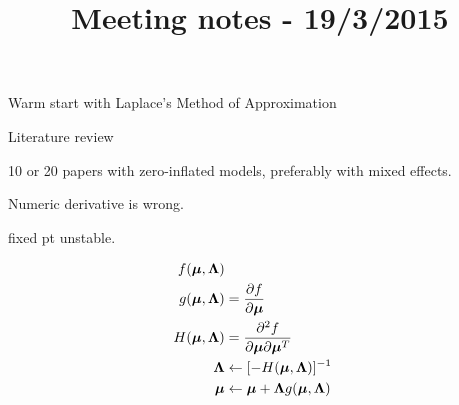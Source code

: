 \documentclass{article}[12pt]
\title{Meeting notes - 19/3/2015}
\begin{document}
Warm start with Laplace's Method of Approximation

Literature review

10 or 20 papers with zero-inflated models, preferably with mixed effects.

Numeric derivative is wrong.

fixed pt unstable.

\begin{align*}
f({\boldsymbol \mu}, {\boldsymbol \Lambda})\\
g({\boldsymbol \mu}, {\boldsymbol \Lambda}) &= \frac{\partial f}{\partial {\boldsymbol\mu}}\\
H({\boldsymbol \mu}, {\boldsymbol \Lambda}) &= \frac{\partial^2 f}{\partial {\boldsymbol\mu} \partial {\boldsymbol\mu}^T}\\
{\boldsymbol \Lambda} &\leftarrow [-H({\boldsymbol \mu}, {\boldsymbol \Lambda})]^{-1}\\
{\boldsymbol \mu} &\leftarrow {\boldsymbol\mu} + {\boldsymbol \Lambda} g({\boldsymbol \mu}, {\boldsymbol \Lambda})
\end{align*}
\end{document}
